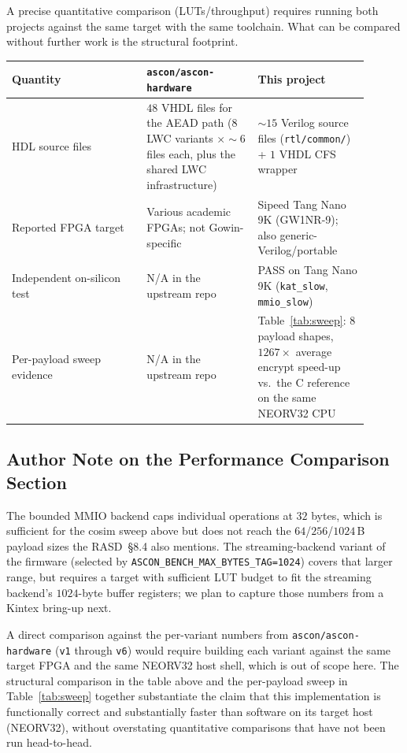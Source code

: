 \documentclass[11pt,a4paper]{article}
\begin{document}
A precise quantitative comparison (LUTs/throughput) requires running
both projects against the same target with the same toolchain. What
can be compared without further work is the structural footprint.

\begin{center}
\begin{tabular}{p{0.34\linewidth}p{0.28\linewidth}p{0.28\linewidth}}
\toprule
\rowcolor{tabhead!20}\textbf{Quantity} & \textbf{\texttt{ascon/ascon-hardware}} & \textbf{This project}\\
\midrule
HDL source files            & $48$ VHDL files for the AEAD path ($8$ LWC variants $\times \sim 6$ files each, plus the shared LWC infrastructure) & $\sim 15$ Verilog source files (\texttt{rtl/common/}) + $1$ VHDL CFS wrapper\\
Reported FPGA target        & Various academic FPGAs; not Gowin-specific & Sipeed Tang Nano 9K (GW1NR-9); also generic-Verilog/portable\\
Independent on-silicon test & N/A in the upstream repo                    & PASS on Tang Nano 9K (\texttt{kat\_slow}, \texttt{mmio\_slow})\\
Per-payload sweep evidence  & N/A in the upstream repo                    & Table~\ref{tab:sweep}: $8$ payload shapes, $1267\times$ average encrypt speed-up vs.\ the C reference on the same NEORV32 CPU\\
\bottomrule
\end{tabular}
\end{center}

\subsection{Author Note on the Performance Comparison Section}

The bounded MMIO backend caps individual operations at $32$ bytes,
which is sufficient for the cosim sweep above but does not reach the
$64$/$256$/$1024$\,B payload sizes the RASD~§8.4 also mentions. The
streaming-backend variant of the firmware (selected by
\texttt{ASCON\_BENCH\_MAX\_BYTES\_TAG=1024}) covers that larger
range, but requires a target with sufficient LUT budget to fit the
streaming backend's $1024$-byte buffer registers; we plan to capture
those numbers from a Kintex bring-up next.

A direct comparison against the per-variant numbers from
\texttt{ascon/ascon-hardware} (\texttt{v1} through \texttt{v6}) would
require building each variant against the same target FPGA and the
same NEORV32 host shell, which is out of scope here. The structural
comparison in the table above and the per-payload sweep in
Table~\ref{tab:sweep} together substantiate the claim that this
implementation is functionally correct and substantially faster than
software on its target host (NEORV32), without overstating
quantitative comparisons that have not been run head-to-head.
\end{document}
